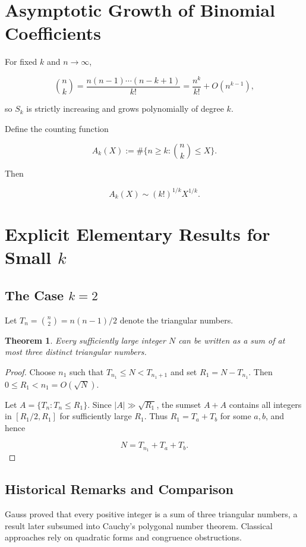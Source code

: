 \documentclass[11pt]{amsart}
\newtheorem{theorem}{Theorem}
\begin{document}
\section{Asymptotic Growth of Binomial Coefficients}

For fixed $k$ and $n \to \infty$,

\[
\binom{n}{k}
= \frac{n(n-1)\cdots(n-k+1)}{k!}
= \frac{n^k}{k!} + O(n^{k-1}),
\]

so $S_k$ is strictly increasing and grows polynomially of degree $k$.

Define the counting function

\[
A_k(X) := \#\{n \ge k : \binom{n}{k} \le X\}.
\]

Then

\[
A_k(X) \sim (k!)^{1/k} X^{1/k}.
\]

\section{Explicit Elementary Results for Small \texorpdfstring{$k$}{k}}

\subsection{The Case $k=2$}

Let $T_n = \binom{n}{2} = n(n-1)/2$ denote the triangular numbers.

\begin{theorem}
Every sufficiently large integer $N$ can be written as a sum of at most three
distinct triangular numbers.
\end{theorem}

\begin{proof}
Choose $n_1$ such that $T_{n_1} \le N < T_{n_1+1}$ and set $R_1 = N - T_{n_1}$.
Then $0 \le R_1 < n_1 = O(\sqrt{N})$.

Let $A = \{T_n : T_n \le R_1\}$. Since $|A| \gg \sqrt{R_1}$, the sumset $A+A$
contains all integers in $[R_1/2, R_1]$ for sufficiently large $R_1$.
Thus $R_1 = T_a + T_b$ for some $a,b$, and hence

\[
N = T_{n_1} + T_a + T_b.
\]

\end{proof}

\subsection{Historical Remarks and Comparison}

Gauss proved that every positive integer is a sum of three triangular numbers,
a result later subsumed into Cauchy's polygonal number theorem. Classical
approaches rely on quadratic forms and congruence obstructions.
\end{document}

